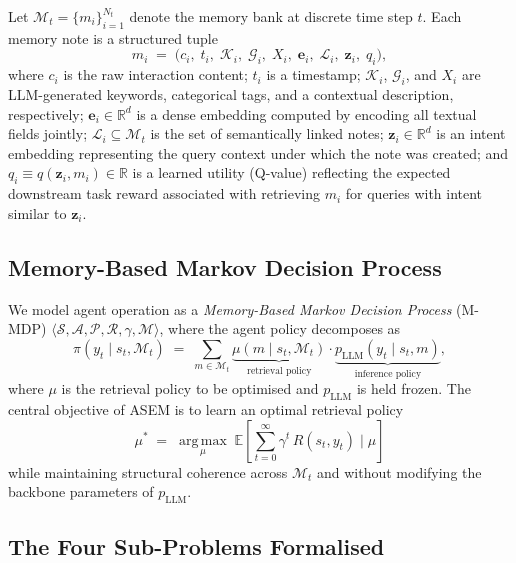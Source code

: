 \documentclass{article}
\newcommand{\memset}{\mathcal{M}}
\newcommand{\note}{m}
\newcommand{\ours}{\textsc{ASEM}\xspace}
\begin{document}
Let $\memset_t = \{\note_i\}_{i=1}^{N_t}$ denote the memory bank at discrete
time step $t$.
Each memory note is a structured tuple
\begin{equation}
  \note_i \;=\;
  \bigl(c_i,\; t_i,\; \mathcal{K}_i,\; \mathcal{G}_i,\; X_i,\;
        \mathbf{e}_i,\; \mathcal{L}_i,\; \mathbf{z}_i,\; q_i\bigr),
  \label{eq:note}
\end{equation}
where $c_i$ is the raw interaction content; $t_i$ is a timestamp;
$\mathcal{K}_i$, $\mathcal{G}_i$, and $X_i$ are LLM-generated keywords,
categorical tags, and a contextual description, respectively;
$\mathbf{e}_i \in \mathbb{R}^d$ is a dense embedding computed by encoding all
textual fields jointly; $\mathcal{L}_i \subseteq \memset_t$ is the set of
semantically linked notes; $\mathbf{z}_i \in \mathbb{R}^d$ is an intent
embedding representing the query context under which the note was created; and
$q_i \equiv q(\mathbf{z}_i, \note_i) \in \mathbb{R}$ is a learned utility
(Q-value) reflecting the expected downstream task reward associated with
retrieving $\note_i$ for queries with intent similar to $\mathbf{z}_i$.

\subsection{Memory-Based Markov Decision Process}

We model agent operation as a \emph{Memory-Based Markov Decision Process}
(M-MDP) $\langle \mathcal{S}, \mathcal{A}, \mathcal{P}, \mathcal{R}, \gamma,
\memset \rangle$, where the agent policy decomposes as
\begin{equation}
  \pi(y_t \mid s_t, \memset_t)
  \;=\;
  \sum_{\note \in \memset_t}
  \underbrace{\mu(\note \mid s_t, \memset_t)}_{\text{retrieval policy}}
  \cdot
  \underbrace{p_{\mathrm{LLM}}(y_t \mid s_t, \note)}_{\text{inference policy}},
  \label{eq:policy_decomp}
\end{equation}
where $\mu$ is the retrieval policy to be optimised and $p_{\mathrm{LLM}}$
is held frozen.
The central objective of \ours is to learn an optimal retrieval policy
\begin{equation}
  \mu^*
  \;=\;
  \operatorname*{arg\,max}_{\mu}\;
  \mathbb{E}\!\left[\sum_{t=0}^{\infty} \gamma^t\, R(s_t, y_t) \;\Big|\; \mu\right]
  \label{eq:objective}
\end{equation}
while maintaining structural coherence across $\memset_t$ and without
modifying the backbone parameters of $p_{\mathrm{LLM}}$.

\subsection{The Four Sub-Problems Formalised}
\end{document}
